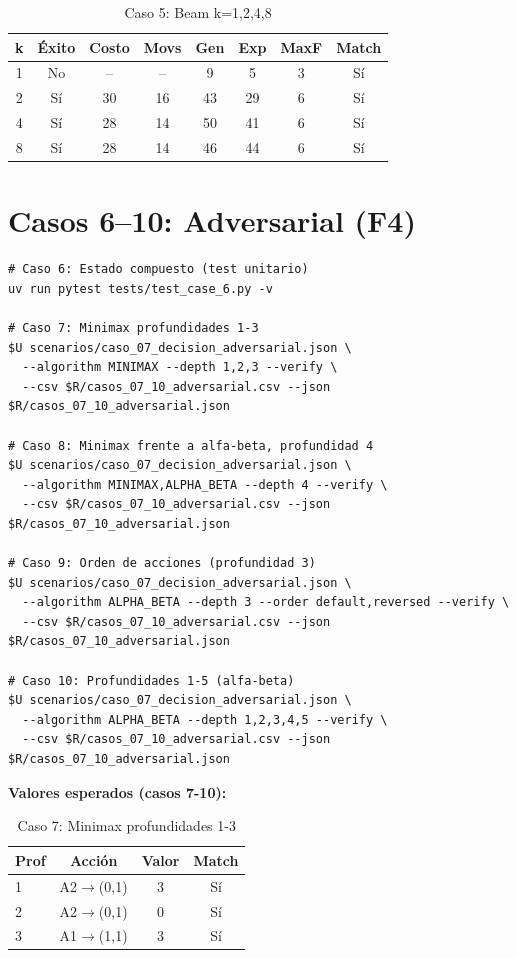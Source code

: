 \begin{table}[H]
\centering
\caption{Caso 5: Beam k=1,2,4,8}
\begin{tabular}{cccccccc}
\toprule
k & Éxito & Costo & Movs & Gen & Exp & MaxF & Match \\
\midrule
1 & No & -- & -- & 9 & 5 & 3 & Sí \\
2 & Sí & 30 & 16 & 43 & 29 & 6 & Sí \\
4 & Sí & 28 & 14 & 50 & 41 & 6 & Sí \\
8 & Sí & 28 & 14 & 46 & 44 & 6 & Sí \\
\bottomrule
\end{tabular}
\end{table}

\section{Casos 6--10: Adversarial (F4)}
\label{sec:rep-f4}

\begin{verbatim}
# Caso 6: Estado compuesto (test unitario)
uv run pytest tests/test_case_6.py -v

# Caso 7: Minimax profundidades 1-3
$U scenarios/caso_07_decision_adversarial.json \
  --algorithm MINIMAX --depth 1,2,3 --verify \
  --csv $R/casos_07_10_adversarial.csv --json $R/casos_07_10_adversarial.json

# Caso 8: Minimax frente a alfa-beta, profundidad 4
$U scenarios/caso_07_decision_adversarial.json \
  --algorithm MINIMAX,ALPHA_BETA --depth 4 --verify \
  --csv $R/casos_07_10_adversarial.csv --json $R/casos_07_10_adversarial.json

# Caso 9: Orden de acciones (profundidad 3)
$U scenarios/caso_07_decision_adversarial.json \
  --algorithm ALPHA_BETA --depth 3 --order default,reversed --verify \
  --csv $R/casos_07_10_adversarial.csv --json $R/casos_07_10_adversarial.json

# Caso 10: Profundidades 1-5 (alfa-beta)
$U scenarios/caso_07_decision_adversarial.json \
  --algorithm ALPHA_BETA --depth 1,2,3,4,5 --verify \
  --csv $R/casos_07_10_adversarial.csv --json $R/casos_07_10_adversarial.json
\end{verbatim}

\textbf{Valores esperados (casos 7-10):}

\begin{table}[H]
\centering
\caption{Caso 7: Minimax profundidades 1-3}
\begin{tabular}{lccc}
\toprule
Prof & Acción & Valor & Match \\
\midrule
1 & A2$\to$(0,1) & 3 & Sí \\
2 & A2$\to$(0,1) & 0 & Sí \\
3 & A1$\to$(1,1) & 3 & Sí \\
\bottomrule
\end{tabular}
\end{table}


